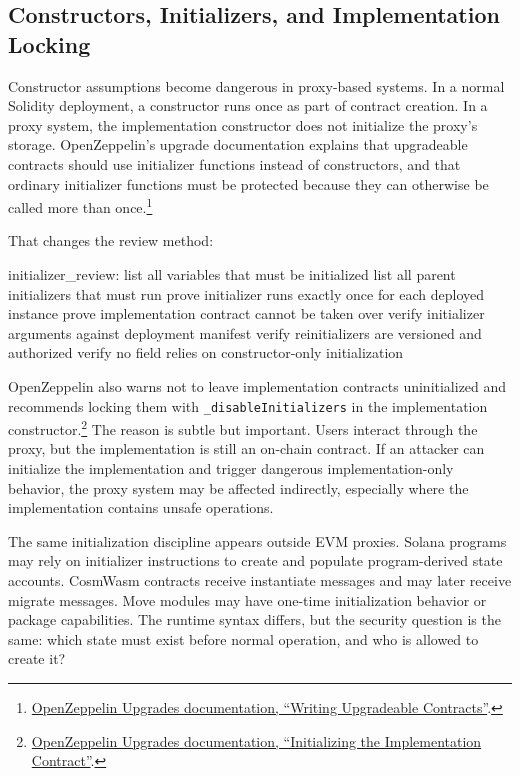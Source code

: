 \subsection{Constructors, Initializers, and Implementation Locking}

Constructor assumptions become dangerous in proxy-based systems. In a normal Solidity deployment, a constructor runs once as part of contract creation. In a proxy system, the implementation constructor does not initialize the proxy's storage. OpenZeppelin's upgrade documentation explains that upgradeable contracts should use initializer functions instead of constructors, and that ordinary initializer functions must be protected because they can otherwise be called more than once.\footnote{\href{https://docs.openzeppelin.com/upgrades-plugins/writing-upgradeable}{OpenZeppelin Upgrades documentation, ``Writing Upgradeable Contracts''}.}

That changes the review method:

\begin{codeblock}
initializer_review:
    list all variables that must be initialized
    list all parent initializers that must run
    prove initializer runs exactly once for each deployed instance
    prove implementation contract cannot be taken over
    verify initializer arguments against deployment manifest
    verify reinitializers are versioned and authorized
    verify no field relies on constructor-only initialization
\end{codeblock}

OpenZeppelin also warns not to leave implementation contracts uninitialized and recommends locking them with \texttt{\_disableInitializers} in the implementation constructor.\footnote{\href{https://docs.openzeppelin.com/upgrades-plugins/writing-upgradeable\#initializing-the-implementation-contract}{OpenZeppelin Upgrades documentation, ``Initializing the Implementation Contract''}.} The reason is subtle but important. Users interact through the proxy, but the implementation is still an on-chain contract. If an attacker can initialize the implementation and trigger dangerous implementation-only behavior, the proxy system may be affected indirectly, especially where the implementation contains unsafe operations.

The same initialization discipline appears outside EVM proxies. Solana programs may rely on initializer instructions to create and populate program-derived state accounts. CosmWasm contracts receive instantiate messages and may later receive migrate messages. Move modules may have one-time initialization behavior or package capabilities. The runtime syntax differs, but the security question is the same: which state must exist before normal operation, and who is allowed to create it?

